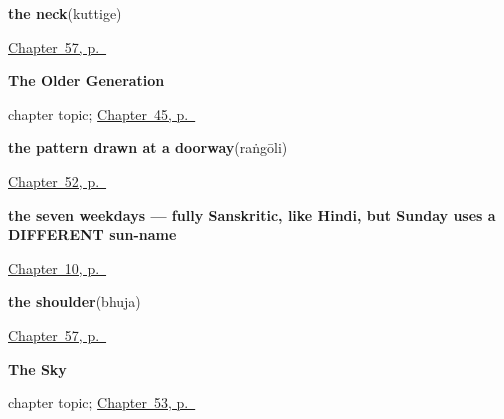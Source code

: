 \noindent\begin{minipage}[t]{\linewidth}
\raggedright
\textbf{the neck}\enspace\emph{}\enspace(kuttige)\par
\footnotesize \hyperref[ch:ka-more-body]{Chapter~57, p.~\pageref*{ch:ka-more-body}}
\end{minipage}\par\smallskip

\noindent\begin{minipage}[t]{\linewidth}
\raggedright
\textbf{The Older Generation}\par
\footnotesize chapter topic; \hyperref[ch:ka-older-generation]{Chapter~45, p.~\pageref*{ch:ka-older-generation}}
\end{minipage}\par\smallskip

\noindent\begin{minipage}[t]{\linewidth}
\raggedright
\textbf{the pattern drawn at a doorway}\enspace\emph{}\enspace(raṅgōli)\par
\footnotesize \hyperref[ch:ka-welcome]{Chapter~52, p.~\pageref*{ch:ka-welcome}}
\end{minipage}\par\smallskip

\noindent\begin{minipage}[t]{\linewidth}
\raggedright
\textbf{the seven weekdays — fully Sanskritic, like Hindi, but Sunday uses a DIFFERENT sun-name}\enspace\emph{      }\par
\footnotesize \hyperref[ch:ka-days-of-the-week]{Chapter~10, p.~\pageref*{ch:ka-days-of-the-week}}
\end{minipage}\par\smallskip

\noindent\begin{minipage}[t]{\linewidth}
\raggedright
\textbf{the shoulder}\enspace\emph{}\enspace(bhuja)\par
\footnotesize \hyperref[ch:ka-more-body]{Chapter~57, p.~\pageref*{ch:ka-more-body}}
\end{minipage}\par\smallskip

\noindent\begin{minipage}[t]{\linewidth}
\raggedright
\textbf{The Sky}\par
\footnotesize chapter topic; \hyperref[ch:ka-sky]{Chapter~53, p.~\pageref*{ch:ka-sky}}
\end{minipage}\par\smallskip

